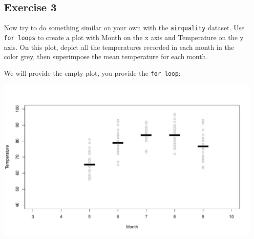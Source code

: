 \documentclass[
]{book}
\newenvironment{Shaded}{\begin{snugshade}}{\end{snugshade}}
\newcommand{\CommentTok}[1]{\textcolor[rgb]{0.56,0.35,0.01}{\textit{#1}}}
\newcommand{\ControlFlowTok}[1]{\textcolor[rgb]{0.13,0.29,0.53}{\textbf{#1}}}
\newcommand{\DataTypeTok}[1]{\textcolor[rgb]{0.13,0.29,0.53}{#1}}
\newcommand{\DecValTok}[1]{\textcolor[rgb]{0.00,0.00,0.81}{#1}}
\newcommand{\KeywordTok}[1]{\textcolor[rgb]{0.13,0.29,0.53}{\textbf{#1}}}
\newcommand{\NormalTok}[1]{#1}
\newcommand{\OperatorTok}[1]{\textcolor[rgb]{0.81,0.36,0.00}{\textbf{#1}}}
\newcommand{\StringTok}[1]{\textcolor[rgb]{0.31,0.60,0.02}{#1}}
\begin{document}
\hypertarget{exercise-3-3}{%
\subsection*{Exercise 3}\label{exercise-3-3}}

Now try to do something similar on your own with the \texttt{airquality} dataset. Use \texttt{for\ loops} to create a plot with Month on the x axis and Temperature on the y axis. On this plot, depict all the temperatures recorded in each month in the color grey, then superimpose the mean temperature for each month.

We will provide the empty plot, you provide the \texttt{for\ loop}:

\begin{Shaded}
\end{Shaded}

\includegraphics{figures/unnamed-chunk-253-1.pdf}
\end{document}
